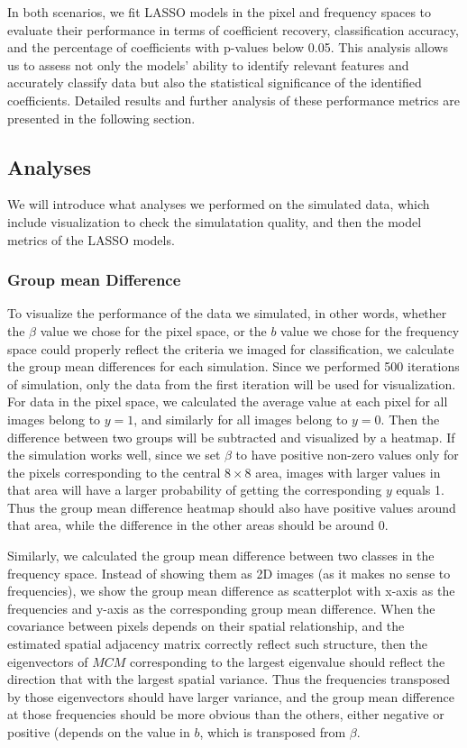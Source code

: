 \documentclass[12pt]{article}
\begin{document}
In both scenarios, we fit LASSO models in the pixel and frequency spaces to evaluate their performance in terms of coefficient recovery, classification accuracy, and the percentage of coefficients with p-values below 0.05. This analysis allows us to assess not only the models' ability to identify relevant features and accurately classify data but also the statistical significance of the identified coefficients. Detailed results and further analysis of these performance metrics are presented in the following section.


\subsection{Analyses}

We will introduce what analyses we performed on the simulated data, which include visualization to check the simulatation quality, and then the model metrics of the LASSO models.

\subsubsection{Group mean Difference}

To visualize the performance of the data we simulated, in other words, whether the \( \beta \) value we chose for the pixel space, or the \( b \) value we chose for the frequency space could properly reflect the criteria we imaged for classification, we calculate the group mean differences for each simulation. Since we performed 500 iterations of simulation, only the data from the first iteration will be used for visualization. For data in the pixel space, we calculated the average value at each pixel for all images belong to \( y=1 \), and similarly for all images belong to \( y=0 \). Then the difference between two groups will be subtracted and visualized by a heatmap. If the simulation works well, since we set \( \beta \) to have positive non-zero values only for the pixels corresponding to the central \( 8 \times 8 \) area, images with larger values in that area will have a larger probability of getting the corresponding \( y \) equals 1. Thus the group mean difference heatmap should also have positive values around that area, while the difference in the other areas should be around 0.

Similarly, we calculated the group mean difference between two classes in the frequency space. Instead of showing them as 2D images (as it makes no sense to frequencies), we show the group mean difference as scatterplot with x-axis as the frequencies and y-axis as the corresponding group mean difference. When the covariance between pixels depends on their spatial relationship, and the estimated spatial adjacency matrix correctly reflect such structure, then the eigenvectors of \( M C M \) corresponding to the largest eigenvalue should reflect the direction that with the largest spatial variance. Thus the frequencies transposed by those eigenvectors should have larger variance, and the group mean difference at those frequencies should be more obvious than the others, either negative or positive (depends on the value in \( b \), which is transposed from \( \beta \). 
\end{document}
